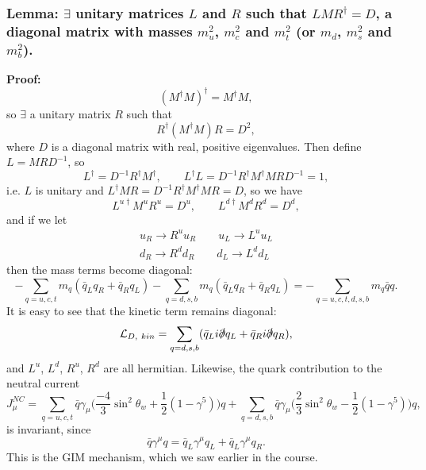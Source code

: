 \subsubsection{Lemma: $\exists$ unitary matrices $L$ and $R$ such that $LMR^\dagger=D$, a diagonal matrix with masses $m_u^2$, $m_c^2$ and $m_t^2$ (or $m_d$, $m_s^2$ and $m_b^2$).}
\textbf{Proof: }
\begin{equation}
(M^\dagger M)^\dagger = M^\dagger M, 
\end{equation}
so $\exists$ a unitary matrix $R$ such that
\begin{equation}
R^\dagger(M^\dagger M)R = D^2,
\end{equation}
where $D$ is a diagonal matrix with real, positive eigenvalues. Then define $L = MRD^{-1}$, so
\begin{equation}
L^\dagger = D^{-1}R^\dagger M^\dagger, \qquad L^\dagger L = D^{-1}R^\dagger M^\dagger MR D^{-1} = 1,
\end{equation}
i.e. $L$ is unitary and $L^\dagger MR = D^{-1}R^\dagger M^\dagger MR = D$, so we have
\begin{equation}
L^{u \dagger}M^u R^u = D^u, \qquad L^{d \dagger}M^d R^d = D^d,
\end{equation}
and if we let
\begin{equation}
\begin{split}
u_R \to R^u u_R \qquad u_L \to L^u u_L \\
d_R \to R^d d_R \qquad d_L \to L^d d_L
\end{split}
\end{equation}
then the mass terms become diagonal:
\begin{equation}
- \sum_{q = u,c,t} m_q(\bar{q}_L q_R + \bar{q}_R q_L) - \sum_{q = d,s,b} m_q(\bar{q}_L q_R + \bar{q}_R q_L) = - \sum_{q=u,c,t,d,s,b} m_q \bar{q}{q}.
\end{equation}
It is easy to see that the kinetic term remains diagonal:
\begin{equation}
\mathcal{L}_{D,\ kin} = \sum_{q = d,s,b}(\bar{q}_L i \slashed{\partial} q_L + \bar{q}_R i \slashed{\partial} q_R),
\end{equation}
and $L^u$, $L^d$, $R^u$, $R^d$ are all hermitian. Likewise, the quark contribution to the neutral current
\begin{equation}
J_\mu^{NC} = \sum_{q=u,c,t}\bar{q}\gamma_\mu\bigg(\frac{-4}{3}\sin^2\theta_w +\frac{1}{2}(1-\gamma^5)\bigg)q + \sum_{q=d,s,b}\bar{q}\gamma_\mu\bigg(\frac{2}{3}\sin^2\theta_w -\frac{1}{2}(1-\gamma^5)\bigg)q,
\end{equation}
is invariant, since 
\begin{equation}
\bar{q}\gamma^\mu q = \bar{q}_L\gamma^\mu q_L + \bar{q}_L\gamma^\mu q_R.
\end{equation}
This is the GIM mechanism, which we saw earlier in the course.
%
